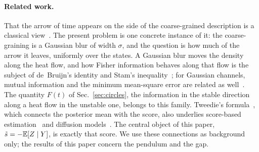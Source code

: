 \paragraph*{Related work.}
That the arrow of time appears on the side of the coarse-grained description is a classical view~\cite{Lebowitz}.
The present problem is one concrete instance of it: the coarse-graining is a Gaussian blur of width $\sigma$, and the question is how much of the arrow it leaves, uniformly over the states.
A Gaussian blur moves the density along the heat flow, and how Fisher information behaves along that flow is the subject of de~Bruijn's identity and Stam's inequality~\cite{Stam}; for Gaussian channels, mutual information and the minimum mean-square error are related as well~\cite{GSV}.
The quantity $F(t)$ of Sec.~\ref{sec:circles}, the information in the stable direction along a heat flow in the unstable one, belongs to this family.
Tweedie's formula~\cite{Robbins,Efron}, which connects the posterior mean with the score, also underlies score-based estimation~\cite{Hyvarinen} and diffusion models~\cite{SongSDE}.
The central object of this paper, $\tilde s=-\mathbb{E}[Z\mid Y]$, is exactly that score.
We use these connections as background only; the results of this paper concern the pendulum and the gap.

